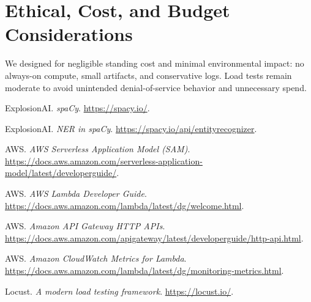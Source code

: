 \documentclass[11pt,a4paper]{article}
\begin{document}
\section*{Ethical, Cost, and Budget Considerations}
We designed for negligible standing cost and minimal environmental impact: no always-on compute, small artifacts, and conservative logs. Load tests remain moderate to avoid unintended denial-of-service behavior and unnecessary spend.

\begin{thebibliography}{9}
ExplosionAI. \emph{spaCy}. \url{https://spacy.io/}.

ExplosionAI. \emph{NER in spaCy}. \url{https://spacy.io/api/entityrecognizer}.

AWS. \emph{AWS Serverless Application Model (SAM)}. \url{https://docs.aws.amazon.com/serverless-application-model/latest/developerguide/}.

AWS. \emph{AWS Lambda Developer Guide}. \url{https://docs.aws.amazon.com/lambda/latest/dg/welcome.html}.

AWS. \emph{Amazon API Gateway HTTP APIs}. \url{https://docs.aws.amazon.com/apigateway/latest/developerguide/http-api.html}.

AWS. \emph{Amazon CloudWatch Metrics for Lambda}. \url{https://docs.aws.amazon.com/lambda/latest/dg/monitoring-metrics.html}.

Locust. \emph{A modern load testing framework}. \url{https://locust.io/}.
\end{thebibliography}
\end{document}
